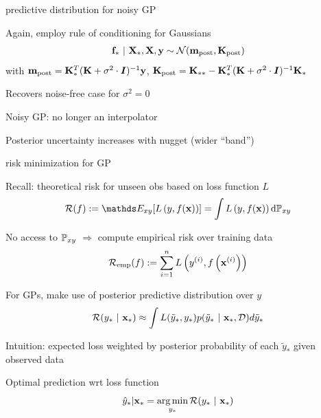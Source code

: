 \documentclass[11pt,compress,t,notes=noshow, xcolor=table]{beamer}
\begin{document}
\begin{framei}[sep=M]{predictive distribution for noisy GP}
\item Again, employ rule of conditioning for Gaussians 
\begin{eqnarray*}
\mathbf{f}_* ~|~ \mathbf{X}_*, \mathbf{X}, \mathbf{y} \sim \mathcal{N}(\mathbf{m}_{\text{post}}, \mathbf{K}_\text{post})
\end{eqnarray*}
with 
$\mathbf{m}_{\text{post}} = \mathbf{K}_{\ast}^{T} (\mathbf{K}+ \sigma^2 \cdot \boldsymbol{I})^{-1}\mathbf{y}$, 
$\mathbf{K}_\text{post} = \mathbf{K}_{\ast \ast} - \mathbf{K}_{\ast}^T (\mathbf{K}  + \sigma^2 \cdot \boldsymbol{I})^{-1}\mathbf{K}_{\ast}$
\item Recovers noise-free case for $\sigma^2 = 0$
\item Noisy GP: no longer an interpolator 
\item Posterior uncertainty increases with nugget (wider ``band'')
\vfill
{}
\end{framei}

\begin{framei}[sep=M]{risk minimization for GP}
\item Recall: theoretical risk for unseen obs based on loss function $L$
$$\riskf := \E_{xy} [\Lxy] = \int \Lxy \text{d}\Pxy$$ 
\item No access to $\mathbb{P}_{xy}$ $\Rightarrow$ compute empirical risk over training data $$\mathcal{R}_{\text{emp}}(f) := \sum\limits_{i=1}^n L\left(y^{(i)}, f\left(\mathbf{x}^{(i)}\right)\right)$$ 
\item For GPs, make use of posterior predictive distribution over $y$
$$
    \mathcal{R}(y_* ~|~ \mathbf{x}_\ast) \approx \int L(\tilde y_*, y_*) p(\tilde y_*~|~\mathbf{x}_\ast, \mathcal{D})d\tilde y_*
  $$
\item Intuition: expected loss weighted by posterior probability of each $\tilde y_*$ given observed data
\item Optimal prediction wrt loss function
$$
    \hat{y}_* | \mathbf{x}_\ast = \operatorname*{arg\,min}_{y_*} \mathcal{R}(y_*~|~ \mathbf{x}_\ast)
  $$
\end{framei}






\end{document}
